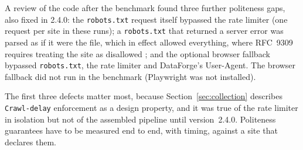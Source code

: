 \documentclass[11pt]{article}
\begin{document}
A review of the code after the benchmark found three further politeness
gaps, also fixed in 2.4.0: the \texttt{robots.txt} request itself bypassed
the rate limiter (one request per site in these runs); a \texttt{robots.txt}
that returned a server error was parsed as if it were the file, which in
effect allowed everything, where RFC~9309 requires treating the site as
disallowed \cite{rfc9309}; and the optional browser fallback bypassed
\texttt{robots.txt}, the rate limiter and DataForge's User-Agent. The
browser fallback did not run in the benchmark (Playwright was not
installed).

The first three defects matter most, because Section~\ref{sec:collection}
describes \texttt{Crawl-delay} enforcement as a design property, and it
was true of the rate limiter in isolation but not of the assembled
pipeline until version~2.4.0. Politeness guarantees have to be measured
end to end, with timing, against a site that declares them.
\end{document}
